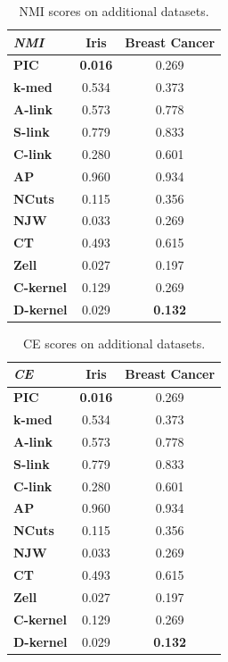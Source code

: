 \begin{table}[h]
    \centering
    \begin{tabular}{|l|c|c|}
    \hline
    \textit{NMI} & \textbf{Iris} & \textbf{Breast Cancer} \\
    \hline
    \textbf{PIC}       & \textbf{0.016} & 0.269 \\ \hline
    \textbf{k-med}     & 0.534 & 0.373 \\ \hline
    \textbf{A-link}    & 0.573 & 0.778 \\ \hline
    \textbf{S-link}    & 0.779 & 0.833 \\ \hline
    \textbf{C-link}    & 0.280 & 0.601 \\ \hline
    \textbf{AP}        & 0.960 & 0.934 \\ \hline
    \textbf{NCuts}     & 0.115 & 0.356 \\ \hline
    \textbf{NJW}       & 0.033 & 0.269 \\ \hline
    \textbf{CT}        & 0.493 & 0.615 \\ \hline
    \textbf{Zell}      & 0.027 & 0.197 \\ \hline
    \textbf{C-kernel}  & 0.129 & 0.269 \\ \hline
    \textbf{D-kernel}  & 0.029 & \textbf{0.132} \\
    \hline
    \end{tabular}
    \caption{NMI scores on additional datasets.}
    \label{table:nmi_additional}
\end{table}

\begin{table}[h]
    \centering
    \begin{tabular}{|l|c|c|}
    \hline
    \textit{CE} & \textbf{Iris} & \textbf{Breast Cancer} \\
    \hline
    \textbf{PIC}       & \textbf{0.016} & 0.269 \\ \hline
    \textbf{k-med}     & 0.534 & 0.373 \\ \hline
    \textbf{A-link}    & 0.573 & 0.778 \\ \hline
    \textbf{S-link}    & 0.779 & 0.833 \\ \hline
    \textbf{C-link}    & 0.280 & 0.601 \\ \hline
    \textbf{AP}        & 0.960 & 0.934 \\ \hline
    \textbf{NCuts}     & 0.115 & 0.356 \\ \hline
    \textbf{NJW}       & 0.033 & 0.269 \\ \hline
    \textbf{CT}        & 0.493 & 0.615 \\ \hline
    \textbf{Zell}      & 0.027 & 0.197 \\ \hline
    \textbf{C-kernel}  & 0.129 & 0.269 \\ \hline
    \textbf{D-kernel}  & 0.029 & \textbf{0.132} \\
    \hline
    \end{tabular}
    \caption{CE scores on additional datasets.}
    \label{table:ce_additional}
\end{table}

